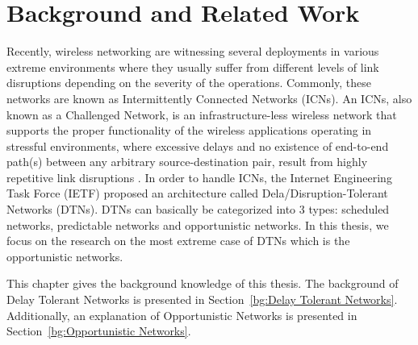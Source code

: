 \chapter{Background and Related Work}
\label{bg}

Recently, wireless networking are witnessing several deployments in various extreme environments where they usually suffer from different levels of link disruptions depending on the severity of the operations. 
Commonly, these networks are known as Intermittently Connected Networks (ICNs). 
An ICNs, also known as a Challenged Network, is an infrastructure-less wireless network that supports the proper functionality of the wireless applications operating in stressful environments, where excessive delays and no existence of end-to-end path(s) between any arbitrary source-destination pair, result from highly repetitive link disruptions \cite{Khabbaz2012}.
In order to handle ICNs, the Internet Engineering Task Force (IETF) \cite{Cerf2007} proposed an architecture called Dela/Disruption-Tolerant Networks (DTNs).
DTNs can basically be categorized into 3 types: scheduled networks, predictable networks and opportunistic networks.
In this thesis, we focus on the research on the most extreme case of DTNs which is the opportunistic networks.

This chapter gives the background knowledge of this thesis. 
The background of Delay Tolerant Networks is presented in Section~\ref{bg:Delay Tolerant Networks}. 
Additionally, an explanation of Opportunistic Networks is presented in Section~\ref{bg:Opportunistic Networks}. 
